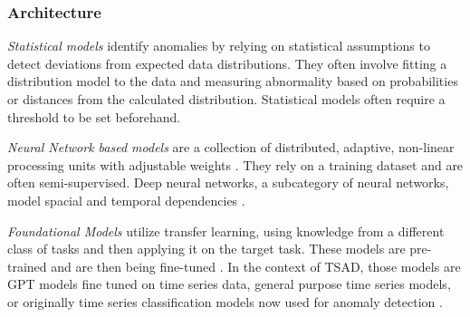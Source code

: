 \documentclass[12pt,oneside]{article}
\begin{document}
\subsubsection{Architecture} \textit{Statistical models} identify anomalies by relying on statistical assumptions to detect deviations from expected data distributions. They often involve fitting a distribution model to the data and measuring abnormality based on probabilities or distances from the calculated distribution. Statistical models often require a threshold to be set beforehand\parencites[p.~6-7]{liu2024elephant}[p.~1]{FOULADI2020102587}. \par \textit{Neural Network based models} are a collection of distributed, adaptive, non-linear processing units with adjustable weights \parencites[p.~427]{GURESEN2011426}. They rely on a training dataset and are often semi-supervised. Deep neural networks, a subcategory of neural networks, model spacial and temporal dependencies \parencites[p.~6-7]{liu2024elephant}[6]{Zamanzadeh_Darban_2024}.\par \textit{Foundational Models} utilize transfer learning, using knowledge from a different class of tasks and then applying it on the target task. These models are pre-trained and are then being fine-tuned \parencites[p.~4]{bommasani2022opportunitiesrisksfoundationmodels}. In the context of TSAD, those models are GPT models fine tuned on time series data, general purpose time series models, or originally time series classification models now used for anomaly detection \parencites[p.~7]{liu2024elephant}.
\end{document}

